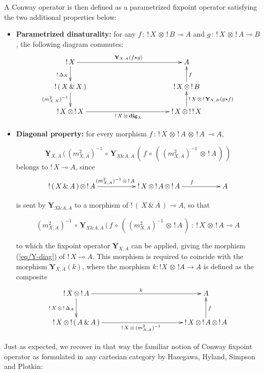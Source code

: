 \documentclass[runningheads,a4paper]{llncs}
\newcommand{\tensor}{\otimes}
\newcommand{\laxdeux}[2]{m^2_{#1 , #2}}
\newcommand{\dig}[1]{\mathbf{dig}_{#1}}
\newcommand{\fixpoint}[1]{\textbf{Y}_{#1}}
\begin{document}
\noindent
A Conway operator is then defined as a parametrized fixpoint operator satisfying the two additional properties below:
\begin{itemize}
\item \textbf{Parametrized dinaturality:} for any $f\,:\,!\,X \,\tensor \,! \, B \multimap A$ and $g\,:\,!\,X \,\tensor \, ! \, A \multimap B$, the following diagram commutes:
$$
\xymatrix @R=2em {
!\,X \ar[d]_{!\,\diag{X}} \ar[rrrr]^{\fixpoint{X,A}(f \star g)} & & & & A\\
!\,(\,X\,\&\,X\,) \ar[d]_{(\laxdeux{X}{X})^{-1}} & & &   & !\,X\,\tensor\,!\, B \ar[u]_f\\
!\,X\,\tensor\,!\,X \ar[rrrr]_{!\,X\,\tensor\,\dig{X}} &&&& !\,X \, \tensor \, !\,!\,X \ar[u]_{!\,X\,\tensor\, !\,\fixpoint{X,B}(g \star f)}\\
}
$$

\item \textbf{Diagonal property:} for every morphism $f\,:\,!\,X\,\tensor\,!\,A\,\tensor\,!\,A\,\multimap A$,


\begin{equation}
\label{eq/Y-diag}
\fixpoint{X,A}\,(\,(\laxdeux{X}{A})^{-1} \, \circ \,\fixpoint{X \& A,A}\,(\,f\, \circ\,(\,(\laxdeux{X}{A})^{-1} \, \tensor \, !\,A\,)\,)
\end{equation}
belongs to  $!\,X \multimap A$, since
$$
\xymatrix  {
!\,(\,X\,\&\,A \,) \,\tensor\,!\,A \ar[rr]^{(\laxdeux{X}{A})^{-1} \, \tensor \, !\,A} & & !\,X\,\tensor\,!\,A\,\tensor\,!\,A \ar[rr]^{f} & & A\\
}
$$

is sent by $\fixpoint{X \& A,A}$ to a morphism of $!\,(\,X \,\&\,A\,) \multimap A$, so that

$$
(\laxdeux{X}{A})^{-1} \, \circ \,\fixpoint{X \& A,A}\,(\,f\, \circ\,(\,(\laxdeux{X}{A})^{-1} \, \tensor \, !\,A\,)  \ : \ !\,X\,\tensor\,!\, A \multimap A
$$

to which the fixpoint operator $\fixpoint{X,A}$ can be applied, giving the morphism (\ref{eq/Y-diag}) of $!\,X \multimap A$. This morphism is required to
coincide with the morphism $\fixpoint{X,A}(k)$, where the morphism $k:{!X}\,\tensor\,{!A}\to A$ is defined as the composite
$$
\xymatrix@R=1em {
!\,X \, \tensor \,!\, A \ar[dd]_{!\,X\,\tensor\,!\,\diag{A}} \ar[rrrr]^{k} & & & & A \\
\\
!\,X\,\tensor\,!\,(\,A\,\&\,A\,) \ar[rrrr]_{!\,X\,\tensor\,(\laxdeux{A}{A})^{-1}} && & &!\,X \, \tensor \,!\, A \, \tensor \,!\, A \ar[uu]_f\\
}
$$
\end{itemize}
\noindent
Just as expected, we recover in that way the familiar notion of Conway fixpoint operator
as formulated in any cartesian category by Hasegawa, Hyland, Simpson and Plotkin:
\end{document}
